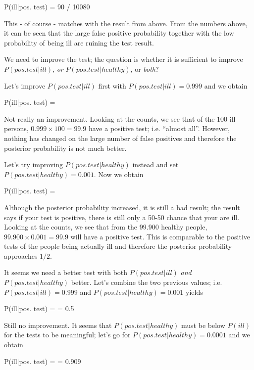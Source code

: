 \bee
P(ill|pos. test) = 90 / 10080 
\eee

This - of course - matches with the result from above. From the numbers above, it can be seen that the large false positive probability together with the low probability of being ill are ruining the test result.

We need to improve the test; the question is whether it is sufficient to improve $P(pos. test | ill)$, \emph{or} $P(pos. test | healthy)$, or \emph{both}?

Let's improve $P(pos. test | ill)$ first with $P(pos. test | ill) = 0.999$ and we obtain

\bee
P(ill|pos. test) =  
\eee

Not really an improvement. Looking at the counts, we see that of the $100$ ill persons, $0.999 \times 100 = 99.9$ have a positive test; i.e. ``almost all''. However, nothing has changed on the large number of false positives and therefore the posterior probability is not much better.

Let's try improving $P(pos. test | healthy)$ instead and set $P(pos. test | healthy)=0.001$. Now we obtain

\bee
P(ill|pos. test) =  
\eee

Although the posterior probability increased, it is still a bad result; the result says if your test is positive, there is still only a 50-50 chance that your are ill. Looking at the counts, we see that from the $99.900$ healthy people, $99.900 \times 0.001 = 99.9$ will have a positive test. This is comparable to the positive tests of the people being actually ill and therefore the posterior probability approaches $1/2$.

It seems we need a better test with both $P(pos. test | ill)$ \emph{and} $P(pos. test | healthy)$ better. Let's combine the two previous values; i.e. $P(pos. test | ill) = 0.999$ and $P(pos. test | healthy)=0.001$ yields

\bee
P(ill|pos. test) =  = 0.5
\eee

Still no improvement. It seems that $P(pos. test | healthy)$ must be below $P(ill)$ for the tests to be meaningful; let's go for $P(pos. test | healthy) = 0.0001$ and we obtain

\bee
P(ill|pos. test) =  = 0.909
\eee


